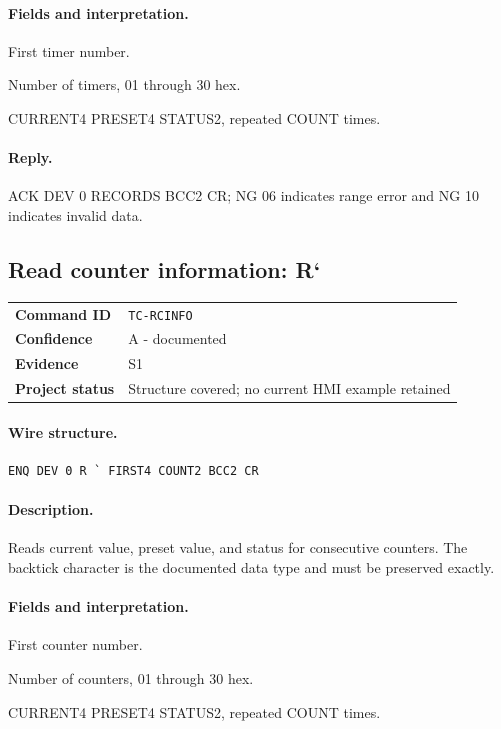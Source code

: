 \documentclass[10pt,letterpaper]{article}
\begin{document}
\paragraph{Fields and interpretation.}
\begin{description}[style=nextline,leftmargin=3.2cm,labelwidth=3.0cm,font=\normalfont\bfseries]
\item[FIRST4] First timer number.
\item[COUNT2] Number of timers, 01 through 30 hex.
\item[Record] CURRENT4 PRESET4 STATUS2, repeated COUNT times.
\end{description}
\paragraph{Reply.} ACK DEV 0 RECORDS BCC2 CR; NG 06 indicates range error and NG 10 indicates invalid data.

\subsection{Read counter information: R`}
\begin{tabularx}{\textwidth}{@{}>{\bfseries}p{2.8cm}X@{}}
Command ID & \texttt{TC-RCINFO} \\
Confidence & A - documented \\
Evidence & S1 \\
Project status & Structure covered; no current HMI example retained \\
\end{tabularx}
\vspace{0.35em}
\paragraph{Wire structure.}
\begin{Verbatim}[breaklines=true,breakanywhere=true,fontsize=\small]
ENQ DEV 0 R ` FIRST4 COUNT2 BCC2 CR
\end{Verbatim}
\paragraph{Description.} Reads current value, preset value, and status for consecutive counters. The backtick character is the documented data type and must be preserved exactly.
\paragraph{Fields and interpretation.}
\begin{description}[style=nextline,leftmargin=3.2cm,labelwidth=3.0cm,font=\normalfont\bfseries]
\item[FIRST4] First counter number.
\item[COUNT2] Number of counters, 01 through 30 hex.
\item[Record] CURRENT4 PRESET4 STATUS2, repeated COUNT times.
\end{description}
\end{document}
